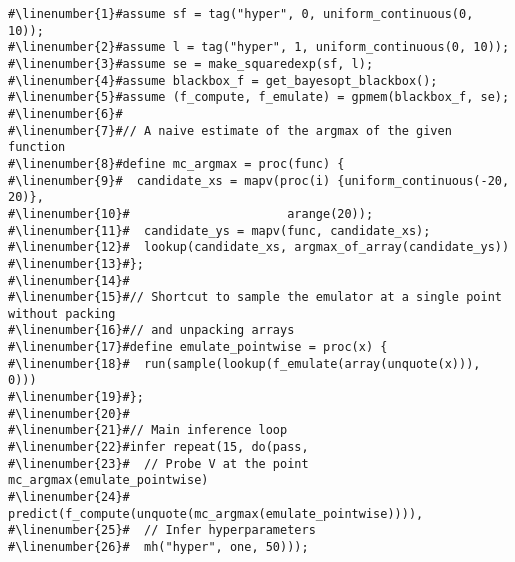 \begin{mdframed}
\begin{minipage}{\linewidth}
\small
\belowcaptionskip=-10pt
\begin{lstlisting}[caption={Bayesian optimization using \gpmem},mathescape,numbers=none,label=alg:bayesopt,escapechar=\#]
#\linenumber{1}#assume sf = tag("hyper", 0, uniform_continuous(0, 10));
#\linenumber{2}#assume l = tag("hyper", 1, uniform_continuous(0, 10));
#\linenumber{3}#assume se = make_squaredexp(sf, l);
#\linenumber{4}#assume blackbox_f = get_bayesopt_blackbox();
#\linenumber{5}#assume (f_compute, f_emulate) = gpmem(blackbox_f, se);
#\linenumber{6}#
#\linenumber{7}#// A naive estimate of the argmax of the given function
#\linenumber{8}#define mc_argmax = proc(func) {
#\linenumber{9}#  candidate_xs = mapv(proc(i) {uniform_continuous(-20, 20)},
#\linenumber{10}#                      arange(20));
#\linenumber{11}#  candidate_ys = mapv(func, candidate_xs);
#\linenumber{12}#  lookup(candidate_xs, argmax_of_array(candidate_ys))
#\linenumber{13}#};
#\linenumber{14}#
#\linenumber{15}#// Shortcut to sample the emulator at a single point without packing
#\linenumber{16}#// and unpacking arrays
#\linenumber{17}#define emulate_pointwise = proc(x) {
#\linenumber{18}#  run(sample(lookup(f_emulate(array(unquote(x))), 0)))
#\linenumber{19}#};
#\linenumber{20}#
#\linenumber{21}#// Main inference loop
#\linenumber{22}#infer repeat(15, do(pass,
#\linenumber{23}#  // Probe V at the point mc_argmax(emulate_pointwise)
#\linenumber{24}#  predict(f_compute(unquote(mc_argmax(emulate_pointwise)))),
#\linenumber{25}#  // Infer hyperparameters
#\linenumber{26}#  mh("hyper", one, 50)));
\end{lstlisting}

\end{minipage}
\end{mdframed}
